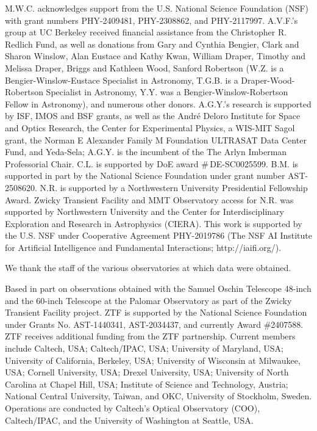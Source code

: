 \documentclass[twocolumn,twocolappendix, linenumbers, trackchanges]{aastex7}
\begin{document}
M.W.C. acknowledges support from the U.S. National Science Foundation (NSF) with grant numbers PHY-2409481, PHY-2308862, and PHY-2117997.
A.V.F.'s group at UC Berkeley received financial assistance from the Christopher R. Redlich Fund, as well as donations from Gary and    
Cynthia Bengier, Clark and Sharon Winslow, Alan Eustace and Kathy Kwan, William Draper, Timothy and Melissa Draper, Briggs and Kathleen Wood, Sanford Robertson (W.Z. is a Bengier-Winslow-Eustace Specialist in Astronomy, T.G.B. is a Draper-Wood-Robertson Specialist in Astronomy, Y.Y. was a Bengier-Winslow-Robertson Fellow in Astronomy), and numerous other donors.  
A.G.Y.'s research is supported by ISF, IMOS and BSF grants, as well as the André Deloro Institute for Space and Optics Research, the Center for Experimental Physics, a WIS-MIT Sagol grant, the Norman E Alexander Family M Foundation ULTRASAT Data Center Fund, and Yeda-Sela;  A.G.Y. is the incumbent of the The Arlyn Imberman Professorial Chair.
C.L. is supported by DoE award \#\,DE-SC0025599.
B.M. is supported in part by the National Science Foundation under grant number AST-2508620.
N.R. is supported by a Northwestern University Presidential Fellowship Award. Zwicky Transient Facility and MMT Observatory access for N.R. was supported by Northwestern University and the Center for Interdisciplinary Exploration and Research in Astrophysics (CIERA).
This work is supported by the U.S. NSF 
under Cooperative Agreement PHY-2019786 (The NSF AI Institute for Artificial Intelligence and Fundamental Interactions; http://iaifi.org/).

We thank the staff of the various observatories at which data were obtained.

Based in part on observations obtained with the Samuel Oschin Telescope 48-inch and the 60-inch
Telescope at the Palomar Observatory as part of the Zwicky Transient Facility project. ZTF is
supported by the National Science Foundation under Grants No. AST-1440341, AST-2034437, and
currently Award \#2407588. ZTF receives additional funding from the ZTF partnership. Current
members include Caltech, USA; Caltech/IPAC, USA; University of Maryland, USA; University of
California, Berkeley, USA; University of Wisconsin at Milwaukee, USA; Cornell University, USA;
Drexel University, USA; University of North Carolina at Chapel Hill, USA; Institute of Science and
Technology, Austria; National Central University, Taiwan, and OKC, University of Stockholm,
Sweden. Operations are conducted by Caltech's Optical Observatory (COO), Caltech/IPAC, and the
University of Washington at Seattle, USA.
\end{document}
